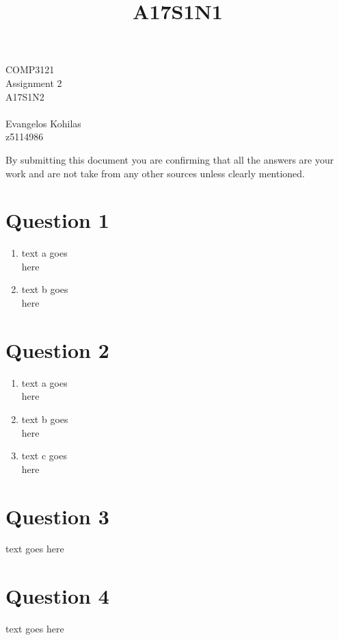 \documentclass{article}
\title{A17S1N1}
\begin{document}
\begin{center}
    \begin{LARGE}
        COMP3121\\
        Assignment 2\\
        A17S1N2\\
        \hrulefill\\
        Evangelos Kohilas\\
        z5114986\\
        \hrulefill
    \end{LARGE}

    \begin{large}
        By submitting this document you are confirming that all the answers are your work and are not take from any other sources unless clearly mentioned.
    \end{large}

\end{center}

\section*{Question 1}
\begin{enumerate}[label=\alph*)]
    \item text a goes\\
        here
    \item text b goes\\
        here
\end{enumerate}

\section*{Question 2}
\begin{enumerate}[label=\alph*)]
    \item text a goes\\
        here
    \item text b goes\\
        here
    \item text c goes\\
        here
\end{enumerate}

\section*{Question 3}
\indent text goes here

\section*{Question 4}
text goes here
\end{document}
